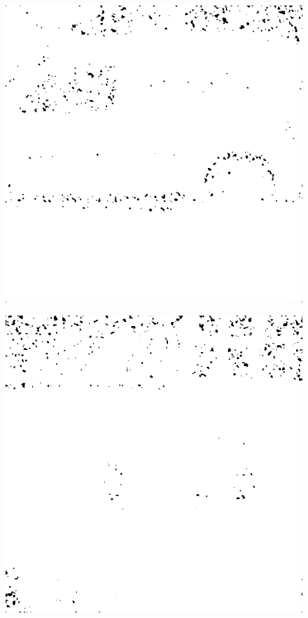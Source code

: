 \begin{figure}[H]
\begin{minipage}[t]{0.3\linewidth}
	\label{fig:sit_m25}
\end{minipage}
\begin{minipage}[t]{0.3\linewidth} %
	\includegraphics[width = 1\linewidth]{gfx/car/car_m30.png}
	\label{fig:car_m30}
\end{minipage}
\begin{minipage}[t]{0.3\linewidth} %
	\includegraphics[width = 1\linewidth]{gfx/hus/hus_m30.png}

\end{minipage}
\end{figure}
